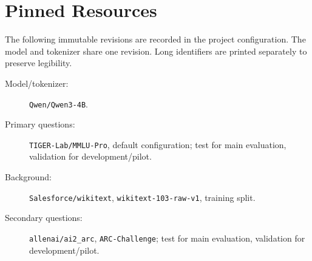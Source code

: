 \documentclass[conference]{IEEEtran}
\begin{document}
\section{Pinned Resources}
\label{app:resources}
The following immutable revisions are recorded in the project configuration. The model and tokenizer share one revision. Long identifiers are printed separately to preserve legibility.
\begin{description}
\item[Model/tokenizer:] \texttt{Qwen/Qwen3-4B}.\\
\item[Primary questions:] \texttt{TIGER-Lab/MMLU-Pro}, default configuration; test for main evaluation, validation for development/pilot.\\
\item[Background:] \texttt{Salesforce/wikitext}, \texttt{wikitext-103-raw-v1}, training split.\\
\item[Secondary questions:] \texttt{allenai/ai2\_arc}, \texttt{ARC-Challenge}; test for main evaluation, validation for development/pilot.\\
\end{description}
\end{document}
